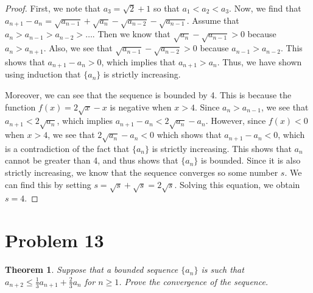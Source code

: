 \documentclass[psamsfonts]{amsart}
\newtheorem{thm}{Theorem}[section]
\theoremstyle{definition}
\theoremstyle{remark}
\numberwithin{equation}{section}
\begin{document}
\begin{proof}
First, we note that $a_3 = \sqrt{2} + 1$ so that $a_1 < a_2 < a_3$. Now, we find that $a_{n+1} - a_n = \sqrt{a_{n-1}} + \sqrt{a_n} - \sqrt{a_{n-2}} - \sqrt{a_{n-1}}$. Assume that $a_{n} > a_{n-1} > a_{n-2} > \ldots$. Then we know that $\sqrt{a_{n}} - \sqrt{a_{n-1}} > 0$ because $a_{n} > a_{n+1}$. Also, we see that $\sqrt{a_{n-1}} - \sqrt{a_{n-2}} > 0$ because $a_{n-1} > a_{n-2}$. This shows that $a_{n+1} - a_n > 0$, which implies that $a_{n+1} > a_n$. Thus, we have shown using induction that $\{ a_n \}$ is strictly increasing. 

Moreover, we can see that the sequence is bounded by 4. This is because the function $f(x) = 2 \sqrt{x} - x$ is negative when $x > 4 $. Since $a_{n} > a_{n-1}$, we see that $a_{n+1} < 2\sqrt{a_n}$, which implies $a_{n+1} - a_n < 2 \sqrt{ a_n} - a_n$. However, since $f(x) < 0$ when $x > 4$, we see that $2\sqrt{a_n} - a_n < 0$  which shows that $a_{n+1} - a_n < 0$, which is a contradiction of the fact that $\{ a_n \}$ is strictly increasing. This shows that $a_n$ cannot be greater than 4, and thus shows that $\{ a_n \}$ is bounded. Since it is also strictly increasing, we know that the sequence converges so some number $s$. We can find this by setting $s = \sqrt{s} + \sqrt{s} = 2 \sqrt{s}$. Solving this equation, we obtain $s = 4$.  
\end{proof}

\section{Problem 13}

\begin{thm}
Suppose that a bounded sequence $\{ a_n \}$ is such that $a_{n+2} \leq \frac{1}{3} a_{n+1} + \frac{2}{3} a_n$ for $n \geq 1$. Prove the convergence of the sequence.
\end{thm}
\end{document}
